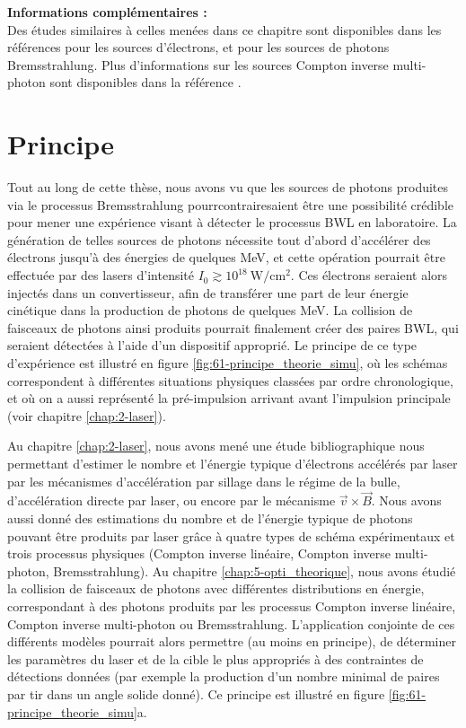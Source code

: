 \begin{refsection}
{\begin{minipage}{\textwidth}
    \medskip
    \textbf{Informations complémentaires :}\\
    Des études similaires à celles menées dans ce chapitre sont disponibles dans les références \parencite{jiang_2014, fedeli_2018c, cristoforetti_2017, dozieres_2019} pour les sources d'électrons, et \cite{jiang_2014a} pour les sources de photons Bremsstrahlung. Plus d'informations sur les sources Compton inverse multi-photon sont disponibles dans la référence \parencite{huang_2019}.
\end{minipage}}
\newpage

\section{Principe}

Tout au long de cette thèse, nous avons vu que les sources de photons produites via le processus Bremsstrahlung pourrcontrairesaient être une possibilité crédible pour mener une expérience visant à détecter le processus BWL en laboratoire.
La génération de telles sources de photons nécessite tout d'abord d'accélérer des électrons jusqu'à des énergies de quelques MeV, et cette opération pourrait être effectuée par des lasers d'intensité $I_0 \gtrsim 10^{18} ~ \si{\W\per\cm^2}$. Ces électrons seraient alors injectés dans un convertisseur, afin de transférer une part de leur énergie cinétique dans la production de photons de quelques MeV. La collision de faisceaux de photons ainsi produits pourrait finalement créer des paires BWL, qui seraient détectées à l'aide d'un dispositif approprié. Le principe de ce type d'expérience est illustré en figure \ref{fig:61-principe_theorie_simu}, où les schémas correspondent à différentes situations physiques classées par ordre chronologique, et où on a aussi représenté la pré-impulsion arrivant avant l'impulsion principale (voir chapitre \ref{chap:2-laser}).

Au chapitre \ref{chap:2-laser}, nous avons mené une étude bibliographique nous permettant d'estimer le nombre et l'énergie typique d'électrons accélérés par laser par les mécanismes d'accélération par sillage dans le régime de la bulle, d'accélération directe par laser, ou encore par le mécanisme $\vec{v} \times \vec{B}$. Nous avons aussi donné des estimations du nombre et de l'énergie typique de photons pouvant être produits par laser grâce à quatre types de schéma expérimentaux et trois processus physiques (Compton inverse linéaire, Compton inverse multi-photon, Bremsstrahlung). Au chapitre \ref{chap:5-opti_theorique}, nous avons étudié la collision de faisceaux de photons avec différentes distributions en énergie, correspondant à des photons produits par les processus Compton inverse linéaire, Compton inverse multi-photon ou Bremsstrahlung. L'application conjointe de ces différents modèles pourrait alors permettre (au moins en principe), de déterminer les paramètres du laser et de la cible le plus appropriés à des contraintes de détections données (par exemple la production d'un nombre minimal de paires par tir dans un angle solide donné). Ce principe est illustré en figure \ref{fig:61-principe_theorie_simu}a.


\end{refsection}
